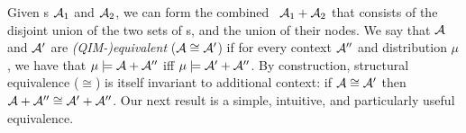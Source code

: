 Given \hgraph s $\mathcal A_1$ and $\mathcal A_2$, 
we can form the combined \hgraph\ $\mathcal A_1 + \mathcal A_2$
that consists of the disjoint union of the two sets of \hyperarc s,
    and the union of their nodes.
We say that $\mathcal A$ and $\mathcal A'$ are \emph{(QIM-)equivalent}
($\mathcal A \cong \mathcal A'$) if for every context $\mathcal A''$ and distribution $\mu$,  we have that
$\mu \models \mathcal A + \mathcal A''$ iff $\mu \models \mathcal A' + \mathcal A''$.
%
By construction, structural equivalence ($\cong$) is itself
invariant to additional context:
     if $\mathcal A \cong \mathcal A'$ then
    $\mathcal A + \mathcal A'' \cong \mathcal A' + \mathcal A''$.
Our next result is a simple, intuitive, and particularly useful equivalence.
